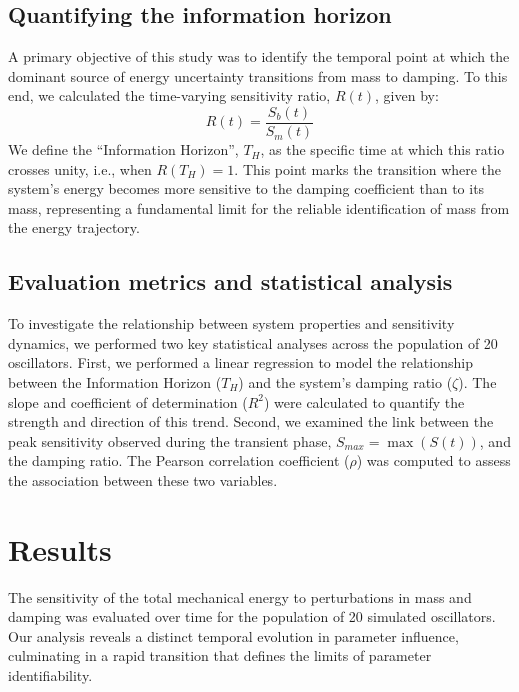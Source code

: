 \documentclass[]{article}
\begin{document}
\subsection{Quantifying the information horizon}
A primary objective of this study was to identify the temporal point at which the dominant source of energy uncertainty transitions from mass to damping. To this end, we calculated the time-varying sensitivity ratio, $R(t)$, given by:
\begin{equation}
R(t) = \frac{S_b(t)}{S_m(t)}
\label{eq:ratio}
\end{equation}
We define the ``Information Horizon'', $T_H$, as the specific time at which this ratio crosses unity, i.e., when $R(T_H) = 1$. This point marks the transition where the system's energy becomes more sensitive to the damping coefficient than to its mass, representing a fundamental limit for the reliable identification of mass from the energy trajectory.

\subsection{Evaluation metrics and statistical analysis}
To investigate the relationship between system properties and sensitivity dynamics, we performed two key statistical analyses across the population of 20 oscillators. First, we performed a linear regression to model the relationship between the Information Horizon ($T_H$) and the system's damping ratio ($\zeta$). The slope and coefficient of determination ($R^2$) were calculated to quantify the strength and direction of this trend. Second, we examined the link between the peak sensitivity observed during the transient phase, $S_{max} = \max(S(t))$, and the damping ratio. The Pearson correlation coefficient ($\rho$) was computed to assess the association between these two variables.

\section{Results}
\label{sec:results}
The sensitivity of the total mechanical energy to perturbations in mass and damping was evaluated over time for the population of 20 simulated oscillators. Our analysis reveals a distinct temporal evolution in parameter influence, culminating in a rapid transition that defines the limits of parameter identifiability.
\end{document}
